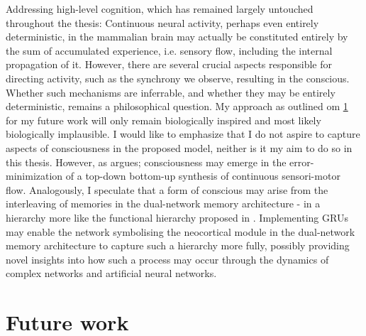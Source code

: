 Addressing high-level cognition, which has remained largely untouched throughout the thesis:
Continuous neural activity, perhaps even entirely deterministic, in the mammalian brain may actually be constituted entirely by the sum of accumulated experience, i.e. sensory flow, including the internal propagation of it. However, there are several crucial aspects responsible for directing activity, such as the synchrony we observe, resulting in the conscious. Whether such mechanisms are inferrable, and whether they may be entirely deterministic, remains a philosophical question.
My approach as outlined om \ref{future_work} for my future work will only remain biologically inspired and most likely biologically implausible. I would like to emphasize that I do not aspire to capture aspects of consciousness in the proposed model, neither is it my aim to do so in this thesis. However, as \cite{Tani2014} argues; consciousness may emerge in the error-minimization of a top-down bottom-up synthesis of continuous sensori-motor flow. Analogously, I speculate that a form of conscious may arise from the interleaving of memories in the dual-network memory architecture - in a hierarchy more like the functional hierarchy proposed in \citep{Yamashita2008, Tani2014}. Implementing GRUs may enable the network symbolising the neocortical module in the dual-network memory architecture to capture such a hierarchy more fully, possibly providing novel insights into how such a process may occur through the dynamics of complex networks and artificial neural networks.

\section{Future work}\label{future_work}

